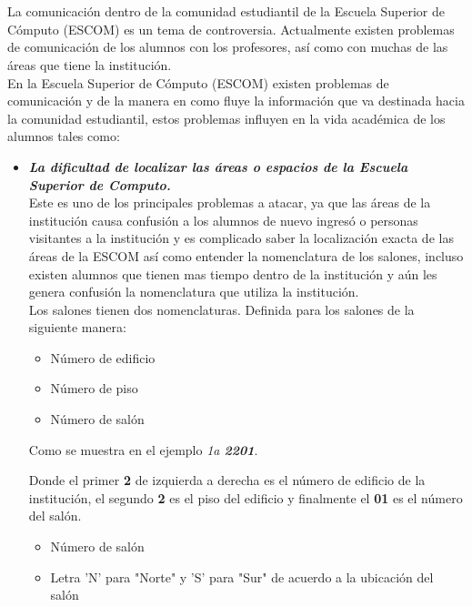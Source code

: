 	\section{}



		La comunicación dentro de la comunidad estudiantil de la Escuela Superior de Cómputo (ESCOM) es un tema de controversia. Actualmente existen problemas de comunicación de los alumnos con los profesores, así como con muchas de las áreas que tiene la institución.\\
	
	En la Escuela Superior de Cómputo (ESCOM) existen problemas de comunicación y de la manera en como fluye la información que va destinada hacia la comunidad estudiantil, estos problemas influyen en la vida académica de los alumnos tales como:
	\begin{itemize}
		\item \textbf{\textit{La dificultad de localizar las áreas o espacios de la Escuela Superior de Computo.}}\\
		
		Este es uno de los principales problemas a atacar, ya que las áreas de la institución causa confusión a los alumnos de nuevo ingresó o personas visitantes a la institución y es complicado saber la localización exacta de las áreas de la ESCOM así como entender la nomenclatura de los salones, incluso existen alumnos que tienen mas tiempo dentro de la institución y aún les genera confusión la nomenclatura que utiliza la institución.\\ 
		
		Los salones tienen dos nomenclaturas. Definida para los salones de la siguiente manera:
		\begin{itemize}
			\item Número de edificio
			\item Número de piso
			\item Número de salón
		\end{itemize}
		
		Como se muestra en el ejemplo \textit{1a \textbf{2201}}.
		
		Donde el primer \textbf{2} de izquierda a derecha es el número de edificio de la institución, el segundo \textbf{2} es el piso del edificio y finalmente el \textbf{01} es el número del salón.\\
		
		\begin{itemize}
			\item Número de salón
			\item Letra 'N' para "Norte"  y  'S' para "Sur" de acuerdo a  la ubicación del salón
		\end{itemize}
		

\end{itemize}
